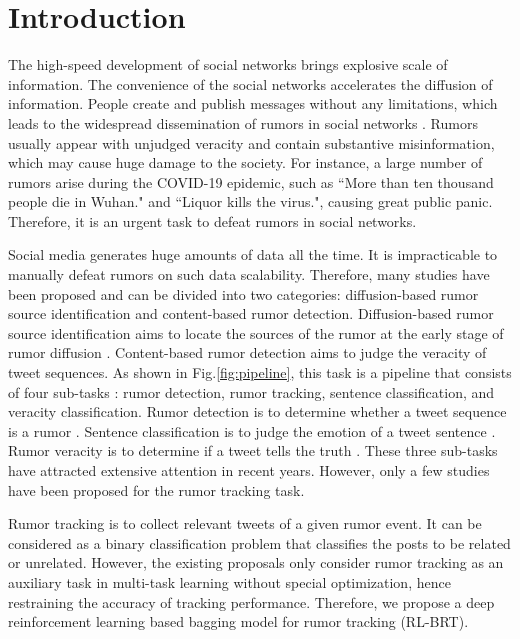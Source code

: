 \section{Introduction}
\label{sec:introduction}
The high-speed development of social networks brings explosive scale of information. The convenience of the social networks accelerates the diffusion of information. People create and publish messages without any limitations, which leads to the widespread dissemination of rumors in social networks \cite{DBLP:journals/corr/KurkaGZ15, DBLP:journals/csur/ZubiagaABLP18, DBLP:conf/sirocco/KostkaOW08, vosoughi2018spread}. Rumors usually appear with unjudged veracity and contain substantive misinformation, which may cause huge damage to the society. For instance, a large number of rumors arise during the COVID-19 epidemic, such as ``More than ten thousand people die in Wuhan." and ``Liquor kills the virus.", causing great public panic. Therefore, it is an urgent task to defeat rumors in social networks.

Social media generates huge amounts of data all the time. It is impracticable to manually defeat rumors on such data scalability. Therefore, many studies have been proposed and can be divided into two categories: diffusion-based rumor source identification and content-based rumor detection. Diffusion-based rumor source identification aims to locate the sources of the rumor at the early stage of rumor diffusion \cite{DBLP:conf/sigmetrics/ShahZ10, DBLP:journals/tit/ShahZ11, DBLP:conf/kdd/LappasTGM10}. Content-based rumor detection aims to judge the veracity of tweet sequences. As shown in Fig.\ref{fig:pipeline}, this task is a pipeline that consists of four sub-tasks \cite{DBLP:journals/csur/ZubiagaABLP18, DBLP:conf/coling/KochkinaLZ18}: rumor detection, rumor tracking, sentence classification, and veracity classification. Rumor detection is to determine whether a tweet sequence is a rumor  \cite{DBLP:conf/socinfo/ZubiagaLP17, DBLP:conf/www/Ma0W19,DBLP:conf/naacl/NguyenDCD19, DBLP:journals/corr/abs-1906-05659}. Sentence classification is to judge the emotion of a tweet sentence \cite{DBLP:conf/semeval/EnayetE17, DBLP:conf/semeval/X17a, DBLP:conf/coling/ZubiagaKLPL16}. Rumor veracity is to determine if a tweet tells the truth \cite{DBLP:conf/coling/KochkinaLZ18, DBLP:conf/acl/LiZS19, DBLP:conf/acl/KumarC19}. These three sub-tasks have attracted extensive attention in recent years. However, only a few studies have been proposed for the rumor tracking task.

Rumor tracking is to collect relevant tweets of a given rumor event. It can be considered as a binary classification problem that classifies the posts to be related or unrelated. However, the existing proposals \cite{DBLP:conf/emnlp/QazvinianRRM11, DBLP:conf/www/ChengNB20}  only consider rumor tracking as an auxiliary task in multi-task learning without special optimization, hence restraining the accuracy of tracking performance.
Therefore, we propose a deep reinforcement learning based bagging model for rumor tracking (RL-BRT).

